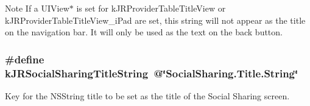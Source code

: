 \begin{DoxyNote}{Note}
If a UIView$\ast$ is set for kJRProviderTableTitleView or kJRProviderTableTitleView\_\-iPad are set, this string will not appear as the title on the navigation bar. It will only be used as the text on the back button. 
\end{DoxyNote}
\hypertarget{group__custom_interface_ga8fb89469dc5225bf0ea4d1faca6aa2ab}{
\subsubsection[{kJRSocialSharingTitleString}]{\setlength{\rightskip}{0pt plus 5cm}\#define kJRSocialSharingTitleString~@\char`\"{}SocialSharing.Title.String\char`\"{}}}
\label{group__custom_interface_ga8fb89469dc5225bf0ea4d1faca6aa2ab}
Key for the {\ttfamily NSString} title to be set as the title of the Social Sharing screen.

